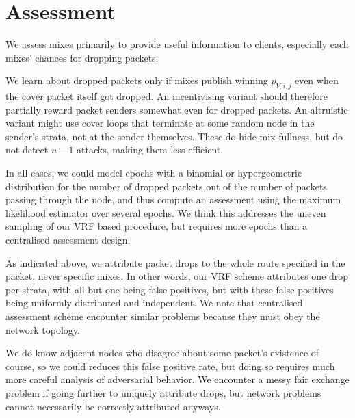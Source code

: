 ﻿\documentclass{sig-alternate-hotpets}
\newtheorem{question}{Question}
\begin{document}



\section{Assessment}

We assess mixes primarily to provide useful information to clients,
especially each mixes' chances for dropping packets.

We learn about dropped packets only if mixes publish winning
$p_{V,i,j}$ even when the cover packet itself got dropped.  
An incentivising variant should therefore partially reward packet
senders somewhat even for dropped packets. 
An altruistic variant might use cover loops that terminate at some
random node in the sender's strata, not at the sender themselves.
These do hide mix fullness, but do not detect $n-1$ attacks, making
them less efficient.  

In all cases, we could model epochs with a binomial or hypergeometric
distribution for the number of dropped packets out of the number of
packets passing through the node, and thus compute an assessment
using the maximum likelihood estimator over several epochs.
We think this addresses the uneven sampling of our VRF based procedure,
but requires more epochs than a centralised assessment design.

As indicated above, we attribute packet drops to the whole route
specified in the packet, never specific mixes.  In other words, our
VRF scheme attributes one drop per strata, with all but one being false
positives, but with these false positives being uniformly distributed
and independent.  We note that centralised assessment scheme encounter
similar problems because they must obey the network topology.

We do know adjacent nodes who disagree about some packet's existence
of course, so we could reduces this false positive rate, but doing so
requires much more careful analysis of adversarial behavior.
We encounter a messy fair exchange problem if going further to uniquely
attribute drops, but network problems cannot necessarily be correctly
attributed anyways.
\end{document}
